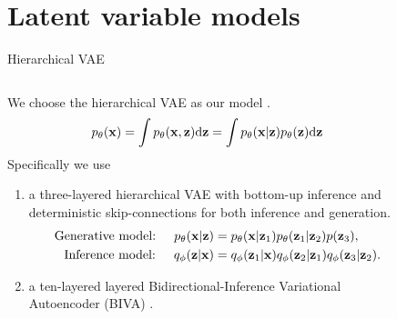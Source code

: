 \section{Latent variable models}

\begin{frame}{Hierarchical VAE}
  \begin{columns}
      \begin{column}{0.7\textwidth}
          We choose the hierarchical VAE as our model \cite{kingma_autoencoding_2014, rezende_stochastic_2014}.
          \begin{equation*}
              p_\theta({\mathbf{x}}) = \int p_\theta({\mathbf{x}},{\mathbf{z}}) \text{d}{\mathbf{z}} = \int p_\theta({\mathbf{x}}|{\mathbf{z}})p_\theta({\mathbf{z}}) \text{d}{\mathbf{z}}
          \end{equation*}
          Specifically we use
          
          \begin{enumerate}
              \item a three-layered hierarchical VAE with bottom-up inference and deterministic skip-connections for both inference and generation.
              \begin{align*}
                  \text{Generative model: }\quad p_\theta({\mathbf{x}}|{\mathbf{z}}) &= p_\theta({\mathbf{x}}|{\mathbf{z}}_1) p_\theta({\mathbf{z}}_1|{\mathbf{z}}_2) p({\mathbf{z}}_3),\\
                  \text{Inference model: }\quad q_\phi({\mathbf{z}}|{\mathbf{x}}) &= q_\phi({\mathbf{z}}_1|{\mathbf{x}})q_\phi({\mathbf{z}}_2|{\mathbf{z}}_1)q_\phi({\mathbf{z}}_3|{\mathbf{z}}_2).
              \end{align*}
              \item a ten-layered layered Bidirectional-Inference Variational Autoencoder (BIVA) \cite{maaloe_biva_2019}.
          \end{enumerate} 
      \end{column}
      \begin{column}{0.3\textwidth}
          \begin{figure}[.5\textwidth]
\end{figure}
\end{column}
\end{columns}
\end{frame}
